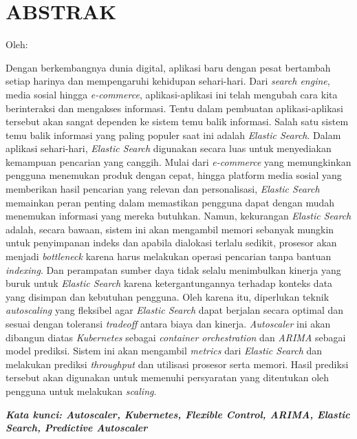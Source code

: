 \clearpage
\chapter*{ABSTRAK}
\begin{center}
    \center
    \begin{singlespace}
      \large\bfseries\MakeUppercase{\thetitle}
      
      \vspace{0.5cm}
  
      \normalfont\normalsize
      Oleh:
  
      \bfseries \theauthor
    \end{singlespace}
\end{center} 

\begin{singlespace}
    Dengan berkembangnya dunia digital, aplikasi baru dengan pesat bertambah setiap harinya dan mempengaruhi kehidupan sehari-hari. Dari \textit{search engine}, media sosial hingga \textit{e-commerce}, aplikasi-aplikasi ini telah mengubah cara kita berinteraksi dan mengakses informasi. Tentu dalam pembuatan aplikasi-aplikasi tersebut akan sangat dependen ke sistem temu balik informasi. Salah satu sistem temu balik informasi yang paling populer saat ini adalah \textit{Elastic Search}. Dalam aplikasi sehari-hari, \textit{Elastic Search} digunakan secara luas untuk menyediakan kemampuan pencarian yang canggih. Mulai dari \textit{e-commerce} yang memungkinkan pengguna menemukan produk dengan cepat, hingga platform media sosial yang memberikan hasil pencarian yang relevan dan personalisasi, \textit{Elastic Search} memainkan peran penting dalam memastikan pengguna dapat dengan mudah menemukan informasi yang mereka butuhkan. Namun, kekurangan \textit{Elastic Search} adalah, secara bawaan, sistem ini akan mengambil memori sebanyak mungkin untuk penyimpanan indeks dan apabila dialokasi terlalu sedikit, prosesor akan menjadi \textit{bottleneck} karena harus melakukan operasi pencarian tanpa bantuan \textit{indexing}. Dan perampatan sumber daya tidak selalu menimbulkan kinerja yang buruk untuk \textit{Elastic Search} karena ketergantungannya terhadap konteks data yang disimpan dan kebutuhan pengguna. Oleh karena itu, diperlukan teknik \textit{autoscaling} yang fleksibel agar \textit{Elastic Search} dapat berjalan secara optimal dan sesuai dengan toleransi \textit{tradeoff} antara biaya dan kinerja. \textit{Autoscaler} ini akan dibangun diatas \textit{Kubernetes} sebagai \textit{container orchestration} dan \textit{ARIMA} sebagai model prediksi. Sistem ini akan mengambil \textit{metrics} dari \textit{Elastic Search} dan melakukan prediksi \textit{throughput} dan utilisasi prosesor serta memori. Hasil prediksi tersebut akan digunakan untuk memenuhi persyaratan yang ditentukan oleh pengguna untuk melakukan \textit{scaling}.

    \textbf{\textit{Kata kunci: Autoscaler, Kubernetes, Flexible Control, ARIMA, Elastic Search, Predictive Autoscaler}}
\end{singlespace}
\clearpage